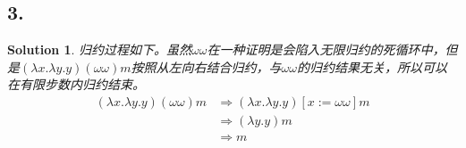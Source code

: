 \documentclass[UTF8]{article}
\newtheorem{Solution}{Solution}
\begin{document}
    \subsection*{3.}
        \begin{Solution}
            归约过程如下。虽然$\omega \omega$在一种证明是会陷入无限归约的死循环中，但是$(\lambda x.\lambda y.y)(\omega \omega)m$按照从左向右结合归约，与$\omega \omega$的归约结果无关，所以可以在有限步数内归约结束。
            \begin{equation*}
                \begin{split}
                    (\lambda x.\lambda y.y)(\omega \omega)m &\Rightarrow (\lambda x.\lambda y.y)[x:=\omega\omega]m \\
                    &\Rightarrow (\lambda y.y)m\\
                    &\Rightarrow m
                \end{split}
            \end{equation*}
        \end{Solution}
\end{document}
